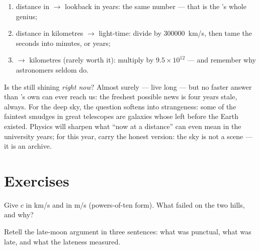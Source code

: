\begin{method}\label{met:g8:speed-of-light:convert}
\begin{enumerate}
  \item distance in  $\to$ lookback in years: the
        same number --- that is the 's whole genius;
  \item distance in kilometres $\to$ light-time: divide by
        \qty{300000}{km/s}, then tame the seconds into
        minutes,  or years;
  \item {} $\to$ kilometres (rarely worth it):
        multiply by $9.5 \times 10^{12}$ --- and remember
        why astronomers seldom do.
\end{enumerate}
\end{method}

\begin{remark}\label{rem:g8:speed-of-light:now}
Is the   still shining \emph{right now}?
Almost surely ---  live long --- but no faster answer
than 's own can ever reach us: the freshest possible
news is four years stale, always. For the deep sky, the
question softens into strangeness: some of the faintest
smudges in great telescopes are galaxies whose  left
before the Earth existed. Physics will sharpen what ``now at
a distance'' can even mean in the university years; for this
year, carry the honest version: the sky is not a scene ---
it is an archive.
\end{remark}

\section{Exercises}

\begin{exercise}[$\star$]\label{exo:g8:speed-of-light:1}
Give $c$ in \unit{km/s} and in \unit{m/s} (powers-of-ten
form). What failed on the two hills, and why?
\end{exercise}

\begin{exercise}[$\star$]\label{exo:g8:speed-of-light:2}
Retell the late-moon argument in three sentences: what was
punctual, what was late, and what the lateness measured.
\end{exercise}

